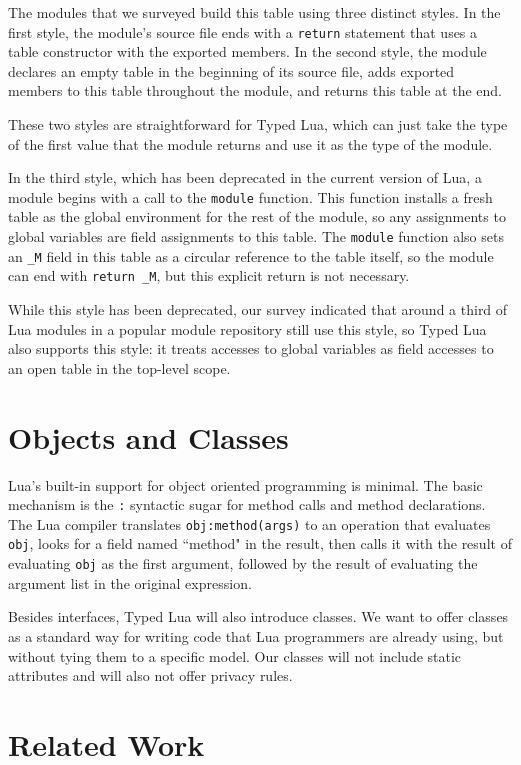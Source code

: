 \documentclass[preprint]{sig-alternate}
\begin{document}
The modules that we surveyed build this table using
three distinct styles. In the first style, the module's
source file ends
with a {\tt return} statement that uses a table constructor
with the exported members. In the second style, the
module declares an empty table in the beginning of its
source file, adds exported members to this table
throughout the module, and returns this table at the end.

These two styles are straightforward for Typed Lua, which
can just take the type of the first value that the module
returns and use it as the type of the module.

In the third style, which has been deprecated in the current
version of Lua, a module begins with a call to the {\tt module}
function. This function installs a fresh table as the
global environment for the rest of the module, so any
assignments to global variables are field assignments to
this table. The {\tt module} function also sets an {\tt \_M}
field in this table as a circular reference to the table
itself, so the module can end with {\tt return \_M}, but
this explicit return is not necessary.

While this style has been deprecated, our survey indicated
that around a third of Lua modules in a popular module
repository still use this style, so Typed Lua also
supports this style: it treats accesses to global
variables as field accesses to an open table
in the top-level scope.

\section{Objects and Classes}
\label{sec:classes}

Lua's built-in support for object oriented programming is
minimal. The basic mechanism is the {\tt :} syntactic
sugar for method calls and method declarations.
The Lua compiler translates {\tt obj:method(args)}
to an operation that evaluates {\tt obj}, looks
for a field named ``method" in the result, then calls
it with the result of evaluating {\tt obj} as the
first argument, followed by the result of evaluating
the argument list in the original expression.

Besides interfaces, Typed Lua will also introduce classes.
We want to offer classes as a standard way for writing code that
Lua programmers are already using, but without tying them to a
specific model.
Our classes will not include static attributes and will also not offer
privacy rules.


\section{Related Work}
 \label{sec:review}
\end{document}
